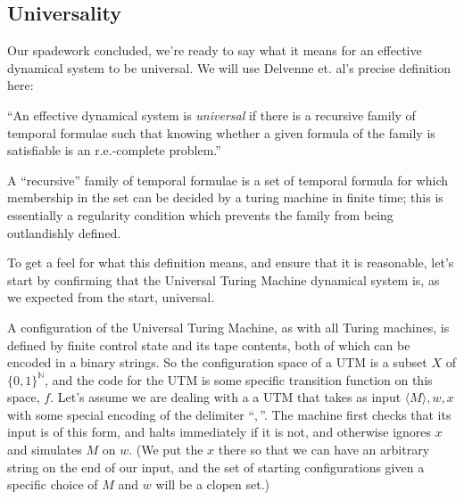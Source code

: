 \documentclass{fkpaper}
\renewcommand{\Nn}{\mathbb{N}}
\begin{document}
\begin{multicols}{2}
  \subsection{Universality}

  Our spadework concluded, we're ready to say what it means for an
  effective dynamical system to be universal. We will use Delvenne et.
  al's precise definition here:

  \begin{definition}[universality]

    ``An effective dynamical system is \emph{universal} if there
    is a recursive family of temporal formulae such that knowing
    whether a given formula of the family is satisfiable is an
    r.e.-complete problem.''
  \end{definition}

  A ``recursive'' family of temporal formulae is a set of temporal formula for which membership in the set can be decided by a turing machine in finite time; this is essentially a regularity condition which prevents the family from being outlandishly defined.

  To get a feel for what this definition means, and ensure that it is reasonable, let's start by confirming that the Universal Turing Machine dynamical system  is, as we expected from the start, universal.

  A configuration of the Universal Turing Machine, as with all Turing machines, is defined by finite control state and its tape contents, both of which can be encoded in a binary strings. So the configuration space of a UTM is a subset $X$ of $\{0,1\}^\Nn$, and the code for the UTM is some specific transition function on this space, $f$. Let's assume we are dealing with a a UTM that takes as input $\langle M \rangle, w, x$ with some special encoding of the delimiter ``$,$''. The machine first checks that its input is of this form, and halts immediately if it is not, and otherwise ignores $x$ and simulates $M$ on $w$. (We put the $x$ there so that we can have an arbitrary string on the end of our input, and the set of starting configurations given a specific choice of $M$ and $w$ will be a clopen set.)


\end{multicols}
\end{document}
